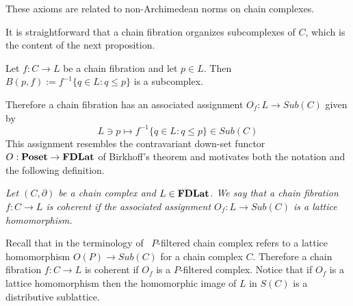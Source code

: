 \begin{rem}
These axioms are related to non-Archimedean norms on chain complexes.
\end{rem}

It is straightforward that a chain fibration organizes subcomplexes of $C$, which is the content of the next proposition.

\begin{prop}\label{prop:cfDown}
Let $f:C\to L$ be a chain fibration and let $p\in L$.  Then $B(p,f):=f^{-1}\{q\in L: q\leq p\}$ is a subcomplex.  
\end{prop}


Therefore a chain fibration has an associated assignment $O_f:L\to Sub(C)$ given by $$L\ni p\mapsto f^{-1}\{q\in L:q\leq p\}\in Sub(C)$$ This assignment resembles the contravariant down-set functor $O:{\bf Poset}\to {\bf FDLat}$ of Birkhoff's theorem and motivates both the notation and the following definition.  


\begin{defn}\label{def:coherent}
{\em
Let $(C,\partial)$ be a chain complex and $L\in {\bf FDLat}$.  We say that a chain fibration $f:C\to L$ is {\em coherent} if the associated assignment $O_f:L\to Sub(C)$ is a lattice homomorphism.
}
\end{defn}


Recall that in the terminology of~\cite{salamon} $P$-filtered chain complex refers to a lattice homomorphism $O(P)\to Sub(C)$ for a chain complex $C$.  Therefore a chain fibration $f:C\to L$ is coherent if $O_f$ is a $P$-filtered complex.   Notice that if $O_f$ is a lattice homomorphism then the homomorphic image of $L$ in $S(C)$ is a distributive sublattice.

